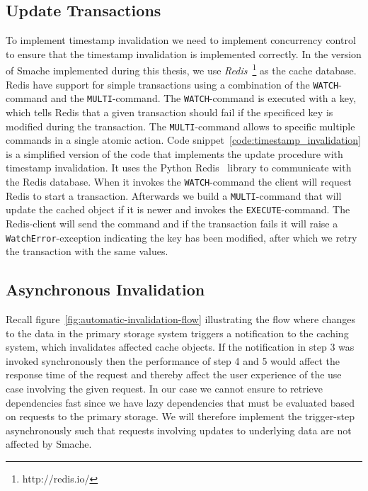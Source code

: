
\subsection{Update Transactions}
\label{subsec:update-transactions}

To implement timestamp invalidation we need to implement concurrency control to ensure that the timestamp invalidation is implemented correctly. In the version of Smache implemented during this thesis, we use \emph{Redis}~\footnote{http://redis.io/} as the cache database. Redis have support for simple transactions using a combination of the \verb$WATCH$-command and the \verb$MULTI$-command. The \verb$WATCH$-command is executed with a key, which tells Redis that a given transaction should fail if the specificed key is modified during the transaction. The \verb$MULTI$-command allows to specific multiple commands in a single atomic action.
Code snippet~\ref{code:timestamp_invalidation} is a simplified version of the code that implements the update procedure with timestamp invalidation. It uses the Python Redis~\cite{docs:python-redis} library to communicate with the Redis database. When it invokes the \verb$WATCH$-command the client will request Redis to start a transaction. Afterwards we build a \verb$MULTI$-command that will update the cached object if it is newer and invokes the \verb$EXECUTE$-command. The Redis-client will send the command and if the transaction fails it will raise a \verb$WatchError$-exception indicating the key has been modified, after which we retry the transaction with the same values.

\begin{figure*}[ht!]
  
  \caption{The code for implementing timestamp invalidation in Python. RedisConnection represents an object communicating with the (Redis) cache database. CacheStore represents the object that communicates with the cache database.}
  \label{code:timestamp_invalidation}
\end{figure*}


\subsection{Asynchronous Invalidation}
\label{subsec:asynchronous-invalidation}

Recall figure~\ref{fig:automatic-invalidation-flow} illustrating the flow where changes to the data in the primary storage system triggers a notification to the caching system, which invalidates affected cache objects. If the notification in step 3 was invoked synchronously then the performance of step 4 and 5 would affect the response time of the request and thereby affect the user experience of the use case involving the given request. In our case we cannot ensure to retrieve dependencies fast since we have lazy dependencies that must be evaluated based on requests to the primary storage. We will therefore implement the trigger-step asynchronously such that requests involving updates to underlying data are not affected by Smache.

